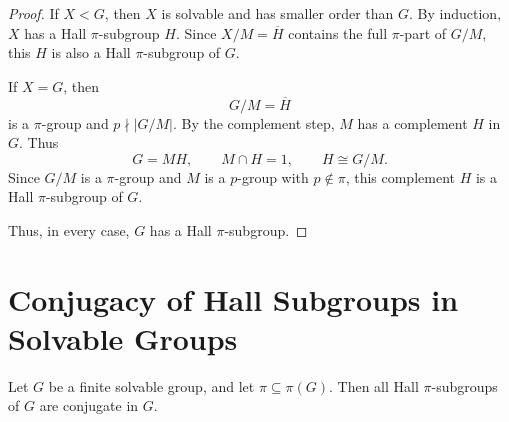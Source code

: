 \begin{proof}
If \(X<G\), then \(X\) is solvable and has smaller order than \(G\). By induction,
\(X\) has a Hall \(\pi\)-subgroup \(H\). Since \(X/M=\overline{H}\) contains the
full \(\pi\)-part of \(G/M\), this \(H\) is also a Hall \(\pi\)-subgroup of \(G\).

If \(X=G\), then
\[
    G/M=\overline{H}
\]
is a \(\pi\)-group and \(p\nmid |G/M|\). By the complement step, \(M\) has a
complement \(H\) in \(G\). Thus
\[
    G=MH,
    \qquad
    M\cap H=1,
    \qquad
    H\cong G/M.
\]
Since \(G/M\) is a \(\pi\)-group and \(M\) is a \(p\)-group with \(p\notin \pi\),
this complement \(H\) is a Hall \(\pi\)-subgroup of \(G\).

Thus, in every case, \(G\) has a Hall \(\pi\)-subgroup.
\end{proof}

\section{Conjugacy of Hall Subgroups in Solvable Groups}

\begin{proposition}
Let \(G\) be a finite solvable group, and let \(\pi\subseteq \pi(G)\). Then all
Hall \(\pi\)-subgroups of \(G\) are conjugate in \(G\).
\end{proposition}

